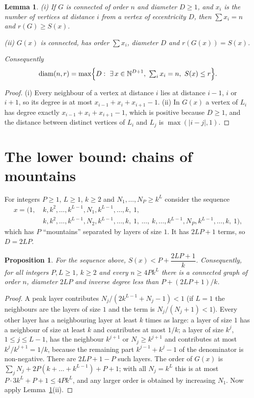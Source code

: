 \documentclass[11pt]{amsart}
\newtheorem{lemma}[theorem]{Lemma}
\newtheorem{proposition}[theorem]{Proposition}
\theoremstyle{definition}
\theoremstyle{remark}
\newcommand{\diam}{\operatorname{diam}}
\newcommand{\N}{\mathbb{N}}
\begin{document}
\begin{lemma}\label{lem:reduction}
{\rm(i)} If $G$ is connected of order $n$ and diameter $D\ge1$, and $x_i$ is the number of vertices at distance $i$ from a vertex of eccentricity $D$, then $\sum x_i=n$ and $r(G)\ge S(x)$.

{\rm(ii)} $G(x)$ is connected, has order $\sum x_i$, diameter $D$ and $r(G(x))=S(x)$.

Consequently
\[
\diam(n,r)=\max\Bigl\{D:\ \exists\,x\in\N^{D+1},\ \textstyle\sum_i x_i=n,\ S(x)\le r\Bigr\}.
\]
\end{lemma}

\begin{proof}
(i) Every neighbour of a vertex at distance $i$ lies at distance $i-1$, $i$ or $i+1$, so its degree is at most $x_{i-1}+x_i+x_{i+1}-1$.
(ii) In $G(x)$ a vertex of $L_i$ has degree exactly $x_{i-1}+x_i+x_{i+1}-1$, which is positive because $D\ge1$, and the distance between distinct vertices of $L_i$ and $L_j$ is $\max(|i-j|,1)$.
\end{proof}

\section{The lower bound: chains of mountains}

For integers $P\ge1$, $L\ge1$, $k\ge2$ and $N_1,\dots,N_P\ge k^L$ consider the sequence
\begin{align*}
x=\bigl(1,\ &k,k^2,\dots,k^{L-1},N_1,k^{L-1},\dots,k,\ 1,\\
&k,k^2,\dots,k^{L-1},N_2,k^{L-1},\dots,k,\ 1,\ \dots,\ k,\dots,k^{L-1},N_P,k^{L-1},\dots,k,\ 1\bigr),
\end{align*}
which has $P$ ``mountains'' separated by layers of size $1$. It has $2LP+1$ terms, so $D=2LP$.

\begin{proposition}\label{prop:lower}
For the sequence above, $S(x)<P+\dfrac{2LP+1}{k}$.
Consequently, for all integers $P,L\ge1$, $k\ge2$ and every $n\ge 4Pk^L$ there is a connected graph of order $n$, diameter $2LP$ and inverse degree less than $P+(2LP+1)/k$.
\end{proposition}

\begin{proof}
A peak layer contributes $N_j/(2k^{L-1}+N_j-1)<1$ (if $L=1$ the neighbours are the layers of size $1$ and the term is $N_j/(N_j+1)<1$).
Every other layer has a neighbouring layer at least $k$ times as large: a layer of size $1$ has a neighbour of size at least $k$ and contributes at most $1/k$; a layer of size $k^j$, $1\le j\le L-1$, has the neighbour $k^{j+1}$ or $N_j\ge k^{j+1}$ and contributes at most $k^j/k^{j+1}=1/k$, because the remaining part $k^{j-1}+k^j-1$ of the denominator is non-negative.
There are $2LP+1-P$ such layers.
The order of $G(x)$ is $\sum_jN_j+2P(k+\dots+k^{L-1})+P+1$; with all $N_j=k^L$ this is at most $P\cdot3k^L+P+1\le4Pk^L$, and any larger order is obtained by increasing $N_1$.
Now apply Lemma~\ref{lem:reduction}(ii).
\end{proof}
\end{document}
